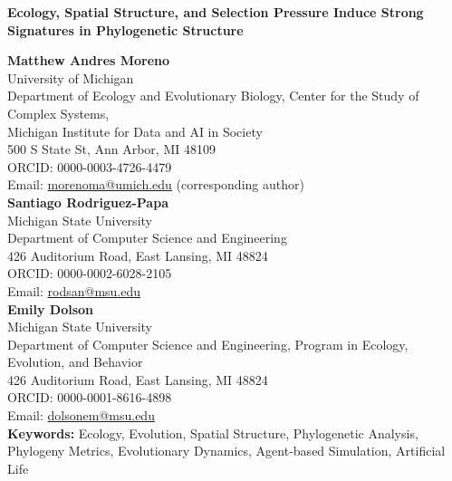 \thispagestyle{empty}  %

\begin{center}
    {\Large\bf Ecology, Spatial Structure, and Selection Pressure Induce Strong Signatures in Phylogenetic Structure}\vspace{0.5cm}

    {\large\bf Matthew Andres Moreno}\\[0.5em]
    University of Michigan\\
    Department of Ecology and Evolutionary Biology, Center for the Study of Complex Systems,\\
    Michigan Institute for Data and AI in Society\\
    500 S State St, Ann Arbor, MI 48109\\
    ORCID: 0000-0003-4726-4479\\
    Email: \href{mailto:morenoma@umich.edu}{morenoma@umich.edu} (corresponding author)\\[1.5em]

    {\large\bf Santiago Rodriguez-Papa}\\[0.5em]
    Michigan State University\\
    Department of Computer Science and Engineering\\
    426 Auditorium Road, East Lansing, MI 48824\\
    ORCID: 0000-0002-6028-2105\\
    Email: \href{mailto:rodsan@msu.edu}{rodsan@msu.edu}\\[1.5em]

    {\large\bf Emily Dolson}\\[0.5em]
    Michigan State University\\
    Department of Computer Science and Engineering, Program in Ecology, Evolution, and Behavior\\
    426 Auditorium Road, East Lansing, MI 48824\\
    ORCID: 0000-0001-8616-4898\\
    Email: \href{mailto:dolsonem@msu.edu}{dolsonem@msu.edu}\\[0.5cm]

    

    \textbf{Keywords:} Ecology, Evolution, Spatial Structure, Phylogenetic Analysis, Phylogeny Metrics, Evolutionary Dynamics, Agent-based Simulation, Artificial Life

    \vfill
\end{center}

~
\clearpage
\newpage